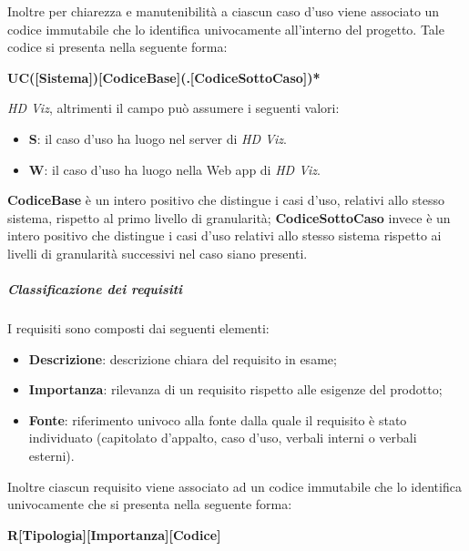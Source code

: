 Inoltre per chiarezza e manutenibilità a ciascun caso d'uso viene associato un codice immutabile che lo identifica univocamente
all'interno del progetto. Tale codice si presenta nella seguente forma:
\begin{center}
    \textbf{UC([Sistema])[CodiceBase](.[CodiceSottoCaso])*}
\end{center}
\emph{HD Viz}, altrimenti il campo può assumere i seguenti valori:
\begin{itemize}
	\item \textbf{S}: il caso d'uso ha luogo nel server di \emph{HD Viz}.
    \item \textbf{W}: il caso d'uso ha luogo nella Web app di \emph{HD Viz}.
\end{itemize}
\textbf{CodiceBase} è un intero positivo che distingue i casi d'uso, relativi allo stesso sistema, rispetto al primo livello di
granularità; \textbf{CodiceSottoCaso} invece è un intero positivo che distingue i casi d'uso relativi allo stesso sistema rispetto ai
livelli di granularità successivi nel caso siano presenti.

\subparagraph{Classificazione dei requisiti}
\label{par:classificazione_requisiti}
I requisiti sono composti dai seguenti elementi:
\begin{itemize}
	\item \textbf{Descrizione}: descrizione chiara del requisito in esame;
	\item \textbf{Importanza}: rilevanza di un requisito rispetto alle esigenze del prodotto;
	\item \textbf{Fonte}: riferimento univoco alla fonte dalla quale il requisito è stato individuato (capitolato d'appalto, caso d'uso,
		verbali interni o verbali esterni).
\end{itemize}

Inoltre ciascun requisito viene associato ad un codice immutabile che lo identifica univocamente che si presenta nella seguente forma:
\begin{center}
    \textbf{R[Tipologia][Importanza][Codice]}
\end{center}

